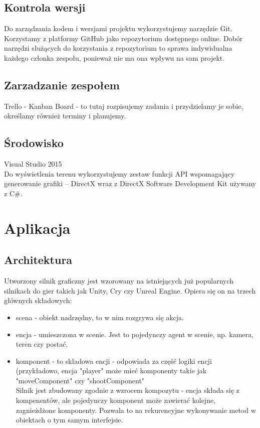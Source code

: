 \documentclass[12pt,a4paper]{article}
\begin{document}
\subsection{Kontrola wersji}
Do zarządzania kodem i wersjami projektu wykorzystujemy narzędzie Git. Korzystamy z platformy GitHub jako repozytorium dostępnego online. Dobór narzędzi służących do korzystania z repozytorium to sprawa indywidualna każdego członka zespołu, ponieważ nie ma ona wpływu na sam projekt.
\subsection{Zarzadzanie zespołem}
Trello - Kanban Board - to tutaj rozpisujemy zadania i przydzielamy je sobie, określamy również terminy i planujemy.
\subsection{Środowisko}
Visual Studio 2015 \\
Do wyświetlenia terenu wykorzystujemy zestaw funkcji API wspomagający generowanie grafiki – DirectX wraz z DirectX Software Development Kit używany z C\#.
\section{Aplikacja}
\subsection{Architektura}
Utworzony silnik graficzny jest wzorowany na istniejących już popularnych silnikach do gier takich jak Unity, Cry czy Unreal Engine. Opiera się on na trzech głównych składowych: \begin{itemize}
\item scena - obiekt nadrzędny, to w nim rozgrywa się akcja.
\item encja - umieszczona w scenie. Jest to pojedynczy agent w scenie, np. kamera, teren czy postać. 
\item komponent - to składowa encji - odpowiada za część logiki encji (przykładowo, encja "player" może mieć komponenty takie jak "moveComponent" czy "shootComponent"
\\
Silnik jest zbudowany zgodnie z wzrocem kompozytu - encja składa się z kompenentów, ale pojedynczy komponent może zawierać kolejne, zagnieżdżone komponenty. Pozwala to na rekurencyjne wykonywanie metod w obiektach o tym samym interfejsie.
\end{itemize}
\end{document}
